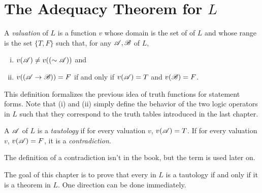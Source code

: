 
\newcommand{\Lext}{\(L^{\ast}\)}
\newcommand{\Lextext}{\(L^{\ast\ast}\)}
\newcommand{\Lp}{\(L^{+}\)}
\newcommand{\Lpp}{\(L^{++}\)}

\section{The Adequacy Theorem for \texorpdfstring{\(L\)}{L}}

\begin{definition}
  A \textit{valuation} of \(L\) is a function \(v\) whose domain is the set of \wfs{} of \(L\) and whose range is the set \(\{T, F\}\) such that, for any \wfs{} \(\mathscr{A}, \mathscr{B}\) of \(L\),

  \begin{enumerate}[(i)]
    \item \(v(\mathscr{A}) \neq v((\sim\mathscr{A}))\) and
    \item \(v((\mathscr{A} \rightarrow \mathscr{B})) = F\) if and only if \(v(\mathscr{A}) = T\) and \(v(\mathscr{B}) = F\).
  \end{enumerate}
\end{definition}

This definition formalizes the previous idea of truth functions for statement forms. Note that (i) and (ii) simply define the behavior of the two logic operators in \(L\) such that they correspond to the truth tables introduced in the last chapter.

\begin{definition}
  A \wf{} \(\mathscr{A}\) of \(L\) is a \textit{tautology} if for every valuation \(v\), \(v(\mathscr{A}) = T\). If for every valuation \(v\), \(v(\mathscr{A}) = F\), it is a \textit{contradiction}.

  \note{} The definition of a contradiction isn't in the book, but the term is used later on.
\end{definition}

The goal of this chapter is to prove that every \wf{} in \(L\) is a tautology if and only if it is a theorem in \(L\). One direction can be done immediately.


